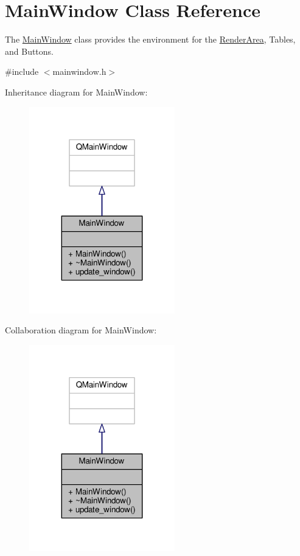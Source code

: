 \hypertarget{classMainWindow}{}\section{Main\+Window Class Reference}
\label{classMainWindow}


The \hyperlink{classMainWindow}{Main\+Window} class provides the environment for the \hyperlink{classRenderArea}{Render\+Area}, Tables, and Buttons.  




{\ttfamily \#include $<$mainwindow.\+h$>$}



Inheritance diagram for Main\+Window\+:\nopagebreak
\begin{figure}[H]
\begin{center}
\leavevmode
\includegraphics[width=179pt]{classMainWindow__inherit__graph}
\end{center}
\end{figure}


Collaboration diagram for Main\+Window\+:\nopagebreak
\begin{figure}[H]
\begin{center}
\leavevmode
\includegraphics[width=179pt]{classMainWindow__coll__graph}
\end{center}
\end{figure}

